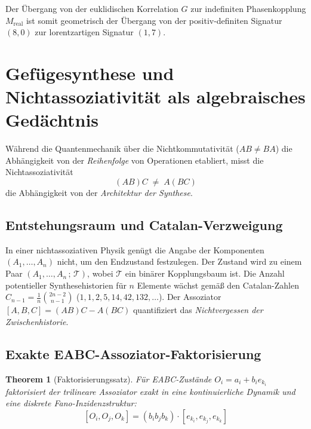 \documentclass[11pt,a4paper]{article}
\newtheorem{theorem}{Theorem}[section]
\theoremstyle{remark}
\begin{document}
	Der Übergang von der euklidischen Korrelation $G$ zur indefiniten Phasenkopplung $M_{\mathrm{real}}$ ist somit geometrisch der Übergang von der positiv-definiten Signatur $(8,0)$ zur lorentzartigen Signatur $(1,7)$.
	
	\section{Gefügesynthese und Nichtassoziativität als algebraisches Gedächtnis}
	
	Während die Quantenmechanik über die Nichtkommutativität ($AB \neq BA$) die Abhängigkeit von der \emph{Reihenfolge} von Operationen etabliert, misst die Nichtassoziativität
	\begin{equation}
		(AB)C \;\neq\; A(BC)
	\end{equation}
	die Abhängigkeit von der \emph{Architektur der Synthese}.
	
	\subsection{Entstehungsraum und Catalan-Verzweigung}
	In einer nichtassoziativen Physik genügt die Angabe der Komponenten $(A_1, \dots, A_n)$ nicht, um den Endzustand festzulegen. Der Zustand wird zu einem Paar $(A_1, \dots, A_n \,;\, \mathcal{T})$, wobei $\mathcal{T}$ ein binärer Kopplungsbaum ist. Die Anzahl potentieller Synthesehistorien für $n$ Elemente wächst gemäß den Catalan-Zahlen $C_{n-1} = \frac{1}{n} \binom{2n-2}{n-1}$ ($1, 1, 2, 5, 14, 42, 132, \dots$).
	Der Assoziator $[A,B,C] = (AB)C - A(BC)$ quantifiziert das \emph{Nichtvergessen der Zwischenhistorie}.
	
	\subsection{Exakte EABC-Assoziator-Faktorisierung}
	
	\begin{theorem}[Faktorisierungssatz]
		Für EABC-Zustände $O_i = a_i + b_i e_{k_i}$ faktorisiert der trilineare Assoziator exakt in eine kontinuierliche Dynamik und eine diskrete Fano-Inzidenzstruktur:
		\begin{equation}
			\label{eq:factorization}
			[O_i, O_j, O_k] = (b_i b_j b_k) \cdot [e_{k_i}, e_{k_j}, e_{k_k}]
		\end{equation}
	\end{theorem}
	
\end{document}
